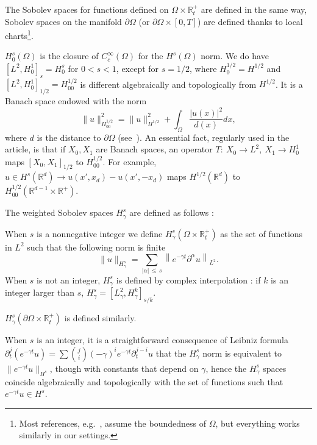 \documentclass[AHL,Unicode,longabstracts,published]{cedram}
\newcommand{\R}{\mathbb{R}}
\begin{document}
The Sobolev spaces for functions defined on $\Omega\times \R_t^+$ are defined in the same way, Sobolev spaces on the manifold $\partial\Omega$ (or $\partial\Omega\times [0,T]$) are defined thanks to local charts\footnote{Most references, e.g.~\cite[Chapter~1]{lionsmagenes}, assume the boundedness of $\Omega$, but everything works similarly in our settings.}.


$H^s_0(\Omega)$ is the closure of $C_c^\infty(\Omega)$ for the $H^s(\Omega)$ norm. We do have $[L^2,H^1_0]_s=H^s_0$ for $0<s<1$, except for $s=1/2$, where $H^{1/2}_{0}=H^{1/2}$ and $[L^2,H^1_0]_{1/2}=H^{1/2}_{00}$ is different algebraically and topologically from $H^{1/2}$. It is a Banach space endowed with the norm
\[
\|u\|_{H^{1/2}_{00}}^2=
\|u\|_{H^{1/2}}^2+\int_{\Omega}
\frac{|u(x)|^2}{d(x)}dx,
\]
where $d$ is the distance to $\partial\Omega$ (see~\cite{lionsmagenes}). An essential fact, regularly used in the article, is that if $X_0,X_1$ are Banach spaces, an operator $T:\ X_0\to L^2,\ X_1\to H^1_0$ maps $[X_0,X_1]_{1/2}$ to $H^{1/2}_{00}$. For example, $u\in H^s(\R^d)\to u(x',x_d)-u(x',-x_d)$ maps $H^{1/2}(\R^d)$ to $H^{1/2}_{00}(\R^{d-1}\times \R^+)$.


The weighted Sobolev spaces $H^s_\gamma$ are defined as follows :
\begin{defi}
When $s$ is a nonnegative integer we define $H^s_\gamma(\Omega\times \R_t^+)$ as the set of functions in $L^2$ such that the following norm is finite
\[
\|u\|_{H^s_\gamma}=\sum_{|\alpha|\,\leq\,s}
\left\|e^{-\gamma t}\partial^\alpha u\right\|_{L^2}.
\]
When $s$ is not an integer, $H^s_\gamma$ is defined by complex interpolation : if $k$ is an integer larger than $s$, $H^s_\gamma=[L^2_\gamma,H^k_\gamma]_{s/k}$.


$H^s_\gamma(\partial\Omega\times \R_t^+)$ is defined similarly.
\end{defi}

When $s$ is an integer, it is a straightforward consequence of Leibniz formula $\partial_t^j(e^{-\gamma t}u)=\sum \binom{j}{i} (-\gamma)^ie^{-\gamma t}\partial_t^{j-i}u$ that the $H^s_\gamma$ norm is equivalent to $\|e^{-\gamma t}u\|_{H^s}$, though with constants that depend on $\gamma$, hence the $H^s_\gamma$ spaces coincide algebraically and topologically with the set of functions such that $e^{-\gamma t}u\in H^s$.
\end{document}
